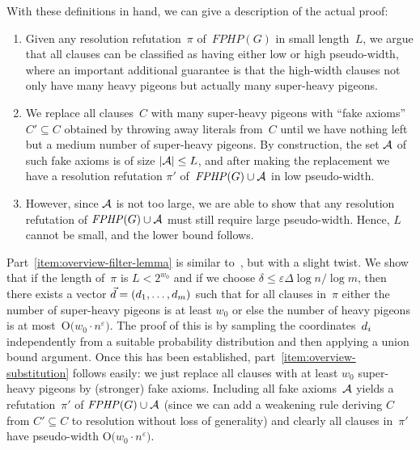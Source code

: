\documentclass{article}
\newcommand{\Bigoh}[1]{\mathrm{O} \bigl( #1 \bigr)}
\newcommand{\setsize}[1]{\lvert#1\rvert}
\newcommand{\union}{\cup}
\newcommand{\wolog}{without loss of generality\xspace}
\newcommand{\proofpi}{\pi}
\newcommand{\clc}{\ensuremath{C}}
\newcommand{\lengthstd}{L}
\newcommand{\formulaformat}[1]{\mathit{#1}}
\newcommand{\graphfphpnot}[1][G]{\formulaformat{FPHP}({#1})}
\newcommand{\fakeaxiomintro}{fake axiom\xspace}
\newcommand{\heavy}{heavy\xspace}
\newcommand{\sheavy}{super-heavy\xspace}
\newcommand{\superheavy}{\sheavy}
\newcommand{\GFPHP}{G\text{-}FPHP}
\renewcommand{\GFPHP}{\graphfphpnot[G]}
\newcommand{\GdegMax}{\Delta}
\newcommand{\gdegmax}{\GdegMax}
\newcommand{\Ax}{\ensuremath\mathcal{A}}
\newcommand{\thr}[1]{ \ensuremath d_{{#1}} }
\newcommand{\vecthr}{\vec{d}}
\newcommand{\pseudowidth}{pseudo-width\xspace}
\numberwithin{equation}{section}
\begin{document}
With these definitions in hand, we can give a description of the
actual proof:
\begin{enumerate}
\item 
\label{item:overview-filter-lemma}
  Given any resolution refutation~$\proofpi$ of~$\GFPHP$ in small
  length~$\lengthstd$, we argue that all clauses can be classified as
  having either low or high \pseudowidth, where 
  an important additional guarantee is that 
  the high-width clauses not
  only have many \heavy pigeons but actually many \superheavy pigeons.
  
\item
  \label{item:overview-substitution}
  We replace all clauses~$\clc$ with many \superheavy pigeons with
  ``\fakeaxiomintro{}s''
  $\clc' \subseteq \clc$
  obtained by throwing away literals from~$\clc$
  until we have nothing left but a medium number of \superheavy pigeons.
  By construction, the set $\Ax$ of such \fakeaxiomintro{}s is of size
  $\setsize{\Ax} \leq \lengthstd$, and after making the replacement we
  have a resolution refutation $\proofpi'$ of~$\GFPHP \union \Ax$
  in low \pseudowidth.
  
\item
\label{item:overview-pseudowidth-lower-bound}
  However, since  $\Ax$ is not too large, we are able to show that
  any resolution refutation of
  $\GFPHP \union \Ax$
  must still require   large pseudo-width. Hence, $\lengthstd$ cannot
  be small, and the lower bound follows.
\end{enumerate}


Part~\ref{item:overview-filter-lemma}
is similar to~\cite{Razborov03ResolutionLowerBoundsWFPHP},
but with a slight twist.
We show that if the length of~$\proofpi$ is  $\lengthstd < 2^{w_0}$
and if we choose
$
\delta \leq 
\varepsilon
\gdegmax \log n / \log m
$, 
then there exists  a vector
$\vecthr = (\thr{1}, \ldots, \thr{m})$
such that for all clauses 
in~$\proofpi$  either the number of \superheavy pigeons is
at least $w_0$
or else the number of \heavy pigeons is at 
\mbox{most
$
\Bigoh{w_0 \cdot n^{\varepsilon}}        
$.}
The proof of this is by sampling the coordinates~$\thr{i}$
independently from a suitable probability distribution and then
applying a union bound argument.
Once this has been established,
part~\ref{item:overview-substitution}
follows easily:
we just replace all clauses with at least
$w_0$ \superheavy pigeons by  
(stronger) \fakeaxiomintro{}s.
Including all \fakeaxiomintro{}s~$\Ax$ yields a
refutation~$\proofpi'$ of
$ \GFPHP \union \Ax $ (since we can add a weakening rule
deriving
$\clc$ from   $\clc' \subseteq \clc$
to resolution \wolog)
and clearly all clauses 
in~$\proofpi'$
have \pseudowidth
$\Bigoh{w_0 \cdot n^\varepsilon}$.
\end{document}
